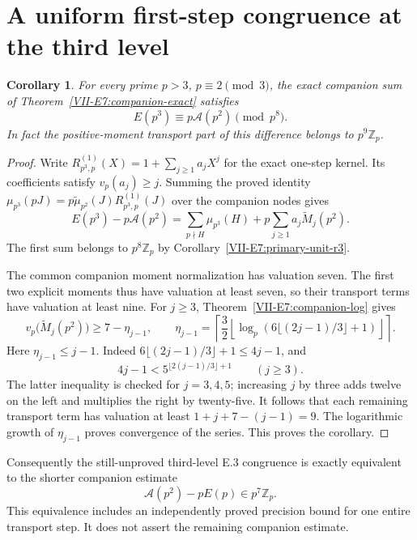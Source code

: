 \documentclass[11pt,letterpaper]{article}
\newtheorem{corollary}[theorem]{Corollary}
\numberwithin{equation}{section}
\begin{document}
\section{A uniform first-step congruence at the third level}\label{loc-VII-14}
\label{VII-sec:E7firststepr3}
\begin{corollary}\label{VII-E7:first-step-r3}
For every prime $p>3$, $p\equiv2\pmod3$, the exact companion sum
of Theorem~\ref{VII-E7:companion-exact} satisfies
\[
 \boxed{E(p^3)\equiv p\mathcal A(p^2)\pmod{p^8}.}
\]
In fact the positive-moment transport part of this difference belongs
to $p^9\mathbb Z_p$.
\end{corollary}
\begin{proof}
Write $R^{(1)}_{p^3,p}(X)=1+\sum_{j\ge1}a_jX^j$ for the exact
one-step kernel. Its coefficients satisfy $v_p(a_j)\ge j$.
Summing the proved identity
$\mu_{p^3}(pJ)=p\widetilde\mu_{p^2}(J)R^{(1)}_{p^3,p}(J)$
over the companion nodes gives
\[
 E(p^3)-p\mathcal A(p^2)
 =\sum_{p\nmid H}\mu_{p^3}(H)
  +p\sum_{j\ge1}a_j\widetilde M_j(p^2).
\]
The first sum belongs to $p^8\mathbb Z_p$ by
Corollary~\ref{VII-E7:primary-unit-r3}.

The common companion moment normalization has valuation seven.
The first two explicit moments thus have valuation at least seven,
so their transport terms have valuation at least nine. For $j\ge3$,
Theorem~\ref{VII-E7:companion-log} gives
\[
 v_p\bigl(\widetilde M_j(p^2)\bigr)\ge7-\eta_{j-1},\qquad
 \eta_{j-1}=\left\lceil\frac32
 \left\lfloor\log_p(6\lfloor(2j-1)/3\rfloor+1)\right\rfloor
 \right\rceil.
\]
Here $\eta_{j-1}\le j-1$. Indeed
$6\lfloor(2j-1)/3\rfloor+1\le4j-1$, and
\[
 4j-1<5^{\lfloor2(j-1)/3\rfloor+1}\qquad(j\ge3).
\]
The latter inequality is checked for $j=3,4,5$; increasing $j$ by
three adds twelve on the left and multiplies the right by twenty-five.
It follows that each remaining transport term has valuation at least
$1+j+7-(j-1)=9$. The logarithmic growth of $\eta_{j-1}$ proves
convergence of the series. This proves the corollary.
\end{proof}

Consequently the still-unproved third-level E.3 congruence is exactly
equivalent to the shorter companion estimate
\[
 \mathcal A(p^2)-pE(p)\in p^7\mathbb Z_p.
\]
This equivalence includes an independently proved precision bound for
one entire transport step. It does not assert the remaining companion
estimate.
\end{document}
